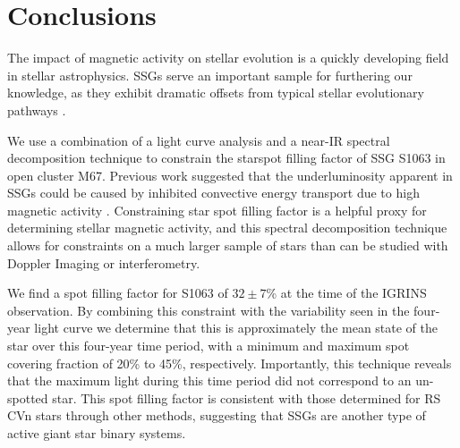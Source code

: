 \documentclass[trackchanges]{aastex631}
\begin{document}




\section{Conclusions}
\label{sec:conclusions}

The impact of magnetic activity on stellar evolution is a quickly developing field in stellar astrophysics. SSGs serve an important sample for furthering our knowledge, as they exhibit dramatic offsets from typical stellar evolutionary pathways \citep{geller17, leiner17}.


We use a combination of a light curve analysis and a near-IR spectral decomposition technique to constrain the starspot filling factor of SSG S1063 in open cluster M67. Previous work suggested that the underluminosity apparent in SSGs could be caused by inhibited convective energy transport due to high magnetic activity \citep{leiner17}. Constraining star spot filling factor is a helpful proxy for determining stellar magnetic activity, and this spectral decomposition technique allows for constraints on a much larger sample of stars than can be studied with Doppler Imaging or interferometry.

We find a spot filling factor for S1063 of $32\pm7$\% at the time of the IGRINS observation. By combining this constraint with the variability seen in the four-year light curve we determine that this is approximately the mean state of the star over this four-year time period, with a minimum and maximum spot covering fraction of 20\% to 45\%, respectively. Importantly, this technique reveals that the maximum light during this time period did not correspond to an un-spotted star. This spot filling factor is consistent with those determined for RS CVn stars through other methods, suggesting that SSGs are another type of active giant star binary systems.
\end{document}
